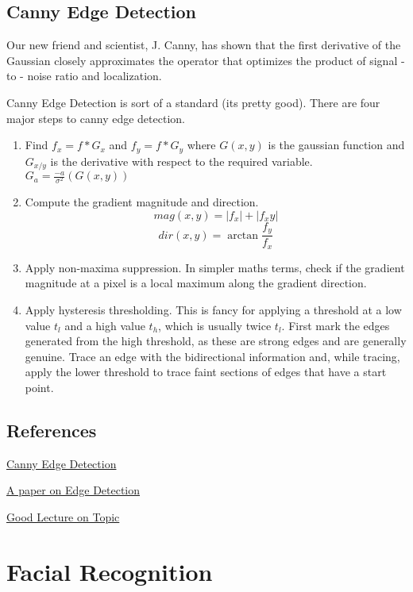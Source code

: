 \subsection{Canny Edge Detection}
Our new friend and scientist, J. Canny, has shown that the first derivative of the Gaussian closely approximates the operator that optimizes the product of signal - to - noise ratio and localization.

Canny Edge Detection is sort of a standard (its pretty good). There are four major steps to canny edge detection.
\begin{enumerate}
	\item Find $f_x = f * G_x$ and $f_y = f * G_y$ where $G(x,y)$ is the gaussian function and $G_{x/y}$ is the derivative with respect to the required variable. $G_a = \frac{-a}{\sigma^2}(G(x,y))$
	\item Compute the gradient magnitude and direction.\[ mag(x,y) = \left| f_x \right| + \left| f_xy \right| \] \[dir(x,y) = \arctan{\frac{f_y}{f_x}}\]
	\item Apply non-maxima suppression. In simpler maths terms, check if the gradient magnitude at a pixel is a local maximum along the gradient direction.
	\item Apply hysteresis thresholding. This is fancy for applying a threshold at a low value $t_l$ and a high value $t_h$, which is usually twice $t_l$. First mark the edges generated from the high threshold, as these are strong edges and are generally genuine. Trace an edge with the bidirectional information and, while tracing, apply the lower threshold to trace faint sections of edges that have a start point.
\end{enumerate}


\subsection{References}
\href{http://fourier.eng.hmc.edu/e161/lectures/canny/node1.html}{Canny Edge Detection}

\href{https://pdfs.semanticscholar.org/d5c1/d380263318c1b7a7d298500b3617e55ef2fa.pdf}{A paper on Edge Detection}

\href{http://www.me.umn.edu/courses/me5286/vision/VisionNotes/2017/ME5286-Lecture7-2017-EdgeDetection2.pdf}{Good Lecture on Topic}

\section{Facial Recognition}
